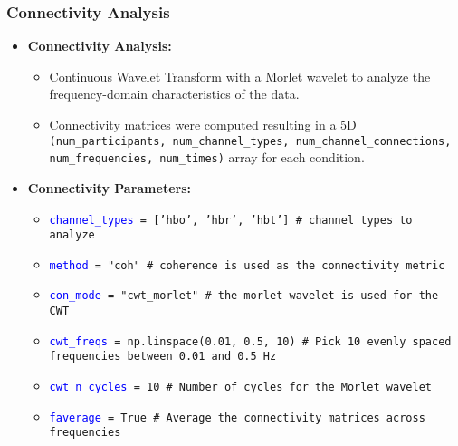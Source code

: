 \documentclass{beamer}
\begin{document}
\begin{frame}
    \frametitle{Connectivity Analysis}
    \begin{itemize}
        \item \textbf{Connectivity Analysis:}
        \begin{itemize}
            \item Continuous Wavelet Transform with a Morlet wavelet to analyze the frequency-domain characteristics of the data.
            \item Connectivity matrices were computed resulting in a 5D \texttt{(num\_participants, num\_channel\_types, num\_channel\_connections, num\_frequencies, num\_times)} array for each condition. 
        \end{itemize}
        \item \textbf{Connectivity Parameters:}
             \begin{itemize}
                    \item \texttt{\textcolor{blue}{channel\_types} = ['hbo', 'hbr', 'hbt'] \textcolor[rgb]{0.0, 0.5, 0.0}{\# channel types to analyze}}
                    \item \texttt{\textcolor{blue}{method} = "coh" \textcolor[rgb]{0.0, 0.5, 0.0}{\# coherence is used as the connectivity metric}}
                    \item \texttt{\textcolor{blue}{con\_mode} = "cwt\_morlet" \textcolor[rgb]{0.0, 0.5, 0.0}{\# the morlet wavelet is used for the CWT}}
                    \item \texttt{\textcolor{blue}{cwt\_freqs} = np.linspace(0.01, 0.5, 10) \textcolor[rgb]{0.0, 0.5, 0.0}{\# Pick 10 evenly spaced frequencies between 0.01 and 0.5 Hz}}
                    \item \texttt{\textcolor{blue}{cwt\_n\_cycles} = 10 \textcolor[rgb]{0.0, 0.5, 0.0}{\# Number of cycles for the Morlet wavelet}}
                    \item \texttt{\textcolor{blue}{faverage} = True \textcolor[rgb]{0.0, 0.5, 0.0}{\# Average the connectivity matrices across frequencies}}
                \end{itemize}
    \end{itemize}
\end{frame}
\end{document}
